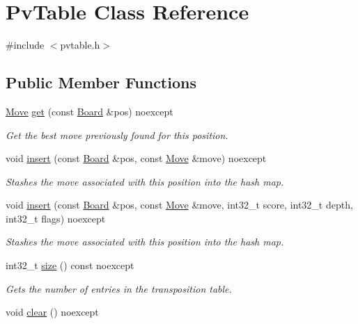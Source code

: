 \hypertarget{classPvTable}{}\section{Pv\+Table Class Reference}
\label{classPvTable}


{\ttfamily \#include $<$pvtable.\+h$>$}

\subsection*{Public Member Functions}
\begin{DoxyCompactItemize}
\item 
\mbox{\hyperlink{classMove}{Move}} \mbox{\hyperlink{classPvTable_affc22eb520f1e4c8fc30366e38af5868}{get}} (const \mbox{\hyperlink{classBoard}{Board}} \&pos) noexcept
\begin{DoxyCompactList}\small\item\em Get the best move previously found for this position. \end{DoxyCompactList}\item 
void \mbox{\hyperlink{classPvTable_aeb05a7085dcd5f16c35dbb30f152056a}{insert}} (const \mbox{\hyperlink{classBoard}{Board}} \&pos, const \mbox{\hyperlink{classMove}{Move}} \&move) noexcept
\begin{DoxyCompactList}\small\item\em Stashes the move associated with this position into the hash map. \end{DoxyCompactList}\item 
void \mbox{\hyperlink{classPvTable_ab26b0faf926e5c7de086f328ca1eaf79}{insert}} (const \mbox{\hyperlink{classBoard}{Board}} \&pos, const \mbox{\hyperlink{classMove}{Move}} \&move, int32\+\_\+t score, int32\+\_\+t depth, int32\+\_\+t flags) noexcept
\begin{DoxyCompactList}\small\item\em Stashes the move associated with this position into the hash map. \end{DoxyCompactList}\item 
int32\+\_\+t \mbox{\hyperlink{classPvTable_a6df38f01a626250eb8d1878d1fbb0029}{size}} () const noexcept
\begin{DoxyCompactList}\small\item\em Gets the number of entries in the transposition table. \end{DoxyCompactList}\item 
void \mbox{\hyperlink{classPvTable_a96b49a337793b2dc29d7f049ae54091f}{clear}} () noexcept

\end{DoxyCompactItemize}
